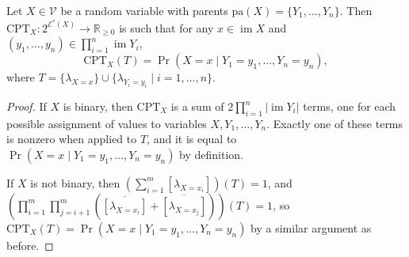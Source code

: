 \documentclass[accepted]{uai2021}
\DeclareMathOperator{\im}{im}
\newenvironment{customlemma}[1]
{\renewcommand\theinnercustomlemma{#1}\innercustomlemma}
{\endinnercustomlemma}
\begin{document}
\begin{customlemma}{1} \label{lemma:cpt}
  Let $X \in \mathcal{V}$ be a random variable with parents $\mathrm{pa}(X) = \{ Y_1,
  \dots, Y_n \}$. Then $\mathrm{CPT}_X\colon 2^{\mathcal{E}^*(X)} \to
  \mathbb{R}_{\ge 0}$ is such that for any $x \in \im X$ and $(y_1, \dots, y_n)
  \in \prod_{i=1}^n \im Y_i$,
  \[
    \mathrm{CPT}_X (T) = \Pr(X = x \mid Y_1 = y_1, \dots, Y_n = y_n),
  \]
  where $T = \{ \lambda_{X=x} \} \cup \{ \lambda_{Y_i=y_i} \mid i = 1, \dots, n
  \}$.
\end{customlemma}
\begin{proof}
  If $X$ is binary, then $\mathrm{CPT}_X$ is a sum of $2\prod_{i=1}^n |\im
  Y_i|$ terms, one for each possible assignment of values to variables $X, Y_1,
  \dots, Y_n$. Exactly one of these terms is nonzero when applied to $T$, and
  it is equal to $\Pr(X = x \mid Y_1 = y_1, \dots, Y_n = y_n)$ by definition.

  If $X$ is not binary, then $\left( \sum_{i=1}^m [\lambda_{X = x_i}]
  \right)(T) = 1$, and $\left( \prod_{i=1}^m \prod_{j=i+1}^m
    (\overline{[\lambda_{X = x_i}]} + \overline{[\lambda_{X = x_j}]})
  \right)(T) = 1$, so $\mathrm{CPT}_X(T) = \Pr(X = x \mid Y_1 = y_1,
  \dots, Y_n = y_n)$ by a similar argument as before.
\end{proof}
\end{document}
